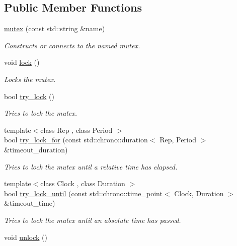 \subsection*{Public Member Functions}
\begin{DoxyCompactItemize}
\item 
\hyperlink{classcpen333_1_1process_1_1posix_1_1mutex_a72ecaf79b2e4ea585b542dc0ed240614}{mutex} (const std\+::string \&name)
\begin{DoxyCompactList}\small\item\em Constructs or connects to the named mutex. \end{DoxyCompactList}\item 
void \hyperlink{classcpen333_1_1process_1_1posix_1_1mutex_a07dccda80dc88292fa490ce47dd0faa6}{lock} ()
\begin{DoxyCompactList}\small\item\em Locks the mutex. \end{DoxyCompactList}\item 
bool \hyperlink{classcpen333_1_1process_1_1posix_1_1mutex_ae19f7c8370308f7333cee340fef91049}{try\+\_\+lock} ()
\begin{DoxyCompactList}\small\item\em Tries to lock the mutex. \end{DoxyCompactList}\item 
{\footnotesize template$<$class Rep , class Period $>$ }\\bool \hyperlink{classcpen333_1_1process_1_1posix_1_1mutex_a28ac1db650efaae2d959df0e555f3d24}{try\+\_\+lock\+\_\+for} (const std\+::chrono\+::duration$<$ Rep, Period $>$ \&timeout\+\_\+duration)
\begin{DoxyCompactList}\small\item\em Tries to lock the mutex until a relative time has elapsed. \end{DoxyCompactList}\item 
{\footnotesize template$<$class Clock , class Duration $>$ }\\bool \hyperlink{classcpen333_1_1process_1_1posix_1_1mutex_a0cfd76098d89d269ad4a89115e7673d1}{try\+\_\+lock\+\_\+until} (const std\+::chrono\+::time\+\_\+point$<$ Clock, Duration $>$ \&timeout\+\_\+time)
\begin{DoxyCompactList}\small\item\em Tries to lock the mutex until an absolute time has passed. \end{DoxyCompactList}\item 
void \hyperlink{classcpen333_1_1process_1_1posix_1_1mutex_a822e51a57ea9e5de1a052aeddf3e4e02}{unlock} ()

\end{DoxyCompactItemize}
